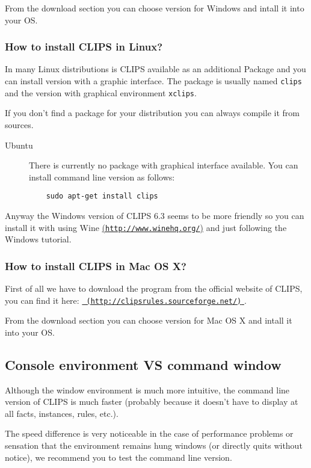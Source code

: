\documentclass[11pt,svgnames]{scrbook}
\begin{document}
From the download section you can choose version for Windows and intall it into your OS.


\subsubsection*{How to install CLIPS in Linux?}
In many Linux distributions is CLIPS available as an additional Package and you can install version with a graphic interface. The package is usually named \texttt{clips} and the version with graphical environment \texttt{xclips}. 

If you don't find a package for your distribution you can always compile it from sources.

\begin{description}
 \item[Ubuntu] There is currently no package with graphical interface available. You can install command line version as follows:
\begin{verbatim}
	sudo apt-get install clips
\end{verbatim}
\end{description}

Anyway the Windows version of CLIPS 6.3 seems to be more friendly so you can install it with using Wine \break
\href{http://www.winehq.org/}{(\texttt{http://www.winehq.org/})} and just following the Windows tutorial.

\subsubsection*{How to install CLIPS in Mac OS X?}

First of all we have to download the program from the official website of CLIPS, you can find it here:\break
\href{http://clipsrules.sourceforge.net/}{\texttt{
(http://clipsrules.sourceforge.net/)} }. 

From the download section you can choose version for Mac OS X and intall it into your OS.


\subsection{Console environment VS command window}

Although the window environment is much more intuitive, the command line version of CLIPS is much faster (probably because it doesn't have to display at all facts, instances, rules, etc.).

The speed difference is very noticeable in the case of performance problems or
sensation that the environment remains hung windows (or directly quits
without notice), we recommend you to test the command line version.
\end{document}
